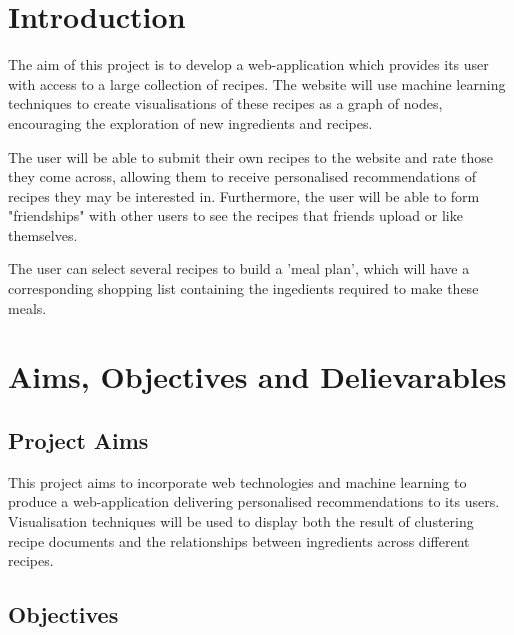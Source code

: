 %
%
\section{Introduction}

The aim of this project is to develop a web-application which provides its user with access to a large collection of recipes. The website will use machine learning techniques to create visualisations of these recipes as a graph of nodes, encouraging the exploration of new ingredients and recipes.

The user will be able to submit their own recipes to the website and rate those they come across, allowing them to receive personalised recommendations of recipes they may be interested in. Furthermore, the user will be able to form "friendships" with other users to see the recipes that friends upload or like themselves.

The user can select several recipes to build a 'meal plan', which will have a corresponding shopping list containing the ingedients required to make these meals. 

%
%
\section{Aims, Objectives and Delievarables}

\subsection{Project Aims}

This project aims to incorporate web technologies and machine learning to produce a web-application delivering personalised recommendations to its users. 
Visualisation techniques will be used to display both the result of clustering recipe documents and the relationships between ingredients across different recipes.
\subsection{Objectives}


